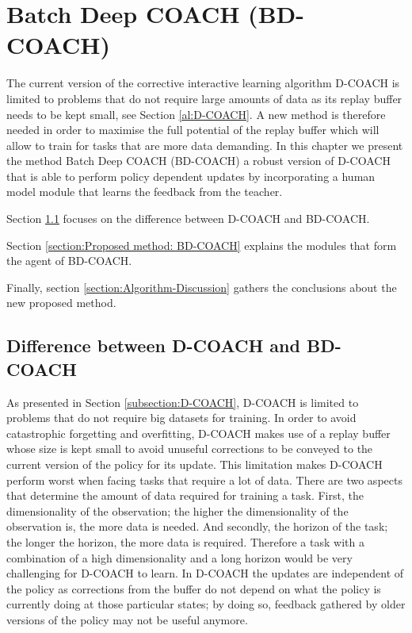 \chapter{Batch Deep COACH (BD-COACH)}
\label{chapter:Proposed Method}



The current version of the corrective interactive learning algorithm D-COACH is limited to problems that do not require large amounts of data as its replay buffer needs to be kept small, see Section \ref{al:D-COACH}. A new method is therefore needed in order to maximise the full potential of the replay buffer which will allow to train for tasks that are more data demanding. In this chapter we present the method Batch Deep COACH (BD-COACH) a robust version of D-COACH that is able to perform policy dependent updates by incorporating a  human model module that learns the feedback from the teacher.

Section \ref{section:Difference between D-COACH and BD-COACH} focuses on the difference between D-COACH and BD-COACH.

Section \ref{section:Proposed method: BD-COACH} explains the modules that form the agent of BD-COACH.


Finally, section \ref{section:Algorithm-Discussion} gathers the conclusions about the new proposed method.  


\section{Difference between D-COACH and BD-COACH}
\label{section:Difference between D-COACH and BD-COACH}

As presented in Section \ref{subsection:D-COACH}, D-COACH is limited to problems that do not require big datasets for training. In order to avoid catastrophic forgetting and overfitting, D-COACH makes use of a replay buffer whose size is kept small to avoid unuseful corrections to be conveyed to the current version of the policy for its update. This limitation makes  D-COACH perform worst when facing tasks that require a lot of data. There are two aspects that determine the amount of data required for training a task. First, the dimensionality of the observation;  the higher the dimensionality of the observation is, the more data is needed. And secondly, the horizon of the task; the longer the horizon, the more data is required. Therefore a task with a combination of a high dimensionality and a long horizon would be very challenging for D-COACH to learn. In D-COACH the updates are independent of the policy as corrections from the buffer do not depend on what the policy is currently doing at those particular states; by doing so, feedback gathered by older versions of the policy may not be useful anymore.


